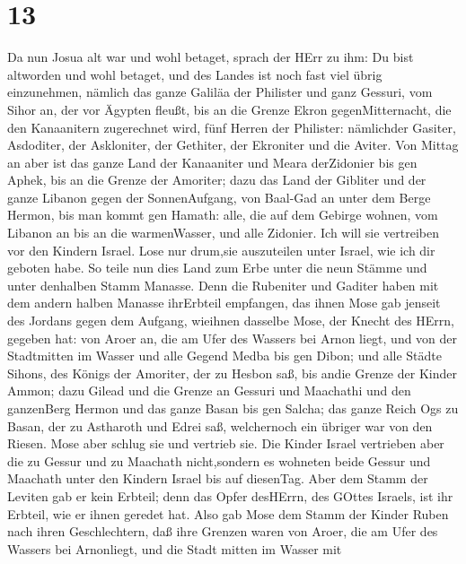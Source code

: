 \hypertarget{section-12}{%
\section{13}\label{section-12}}

 Da nun Josua alt war und wohl betaget, sprach der HErr zu
ihm: Du bist altworden und wohl betaget, und des Landes ist noch fast
viel übrig einzunehmen,  nämlich das ganze Galiläa der
Philister und ganz Gessuri,  vom Sihor an, der vor Ägypten
fleußt, bis an die Grenze Ekron gegenMitternacht, die den Kanaanitern
zugerechnet wird, fünf Herren der Philister: nämlichder Gasiter,
Asdoditer, der Askloniter, der Gethiter, der Ekroniter und die Aviter.
 Von Mittag an aber ist das ganze Land der Kanaaniter und
Meara derZidonier bis gen Aphek, bis an die Grenze der Amoriter;
 dazu das Land der Gibliter und der ganze Libanon gegen der
SonnenAufgang, von Baal-Gad an unter dem Berge Hermon, bis man kommt gen
Hamath:  alle, die auf dem Gebirge wohnen, vom Libanon an
bis an die warmenWasser, und alle Zidonier. Ich will sie vertreiben vor
den Kindern Israel. Lose nur drum,sie auszuteilen unter Israel, wie ich
dir geboten habe.  So teile nun dies Land zum Erbe unter die
neun Stämme und unter denhalben Stamm Manasse.  Denn die
Rubeniter und Gaditer haben mit dem andern halben Manasse ihrErbteil
empfangen, das ihnen Mose gab jenseit des Jordans gegen dem Aufgang,
wieihnen dasselbe Mose, der Knecht des HErrn, gegeben hat: 
von Aroer an, die am Ufer des Wassers bei Arnon liegt, und von der
Stadtmitten im Wasser und alle Gegend Medba bis gen Dibon; 
und alle Städte Sihons, des Königs der Amoriter, der zu Hesbon saß, bis
andie Grenze der Kinder Ammon;  dazu Gilead und die Grenze
an Gessuri und Maachathi und den ganzenBerg Hermon und das ganze Basan
bis gen Salcha;  das ganze Reich Ogs zu Basan, der zu
Astharoth und Edrei saß, welchernoch ein übriger war von den Riesen.
Mose aber schlug sie und vertrieb sie.  Die Kinder Israel
vertrieben aber die zu Gessur und zu Maachath nicht,sondern es wohneten
beide Gessur und Maachath unter den Kindern Israel bis auf diesenTag.
 Aber dem Stamm der Leviten gab er kein Erbteil; denn das
Opfer desHErrn, des GOttes Israels, ist ihr Erbteil, wie er ihnen
geredet hat.  Also gab Mose dem Stamm der Kinder Ruben nach
ihren Geschlechtern,  daß ihre Grenzen waren von Aroer, die
am Ufer des Wassers bei Arnonliegt, und die Stadt mitten im Wasser mit
